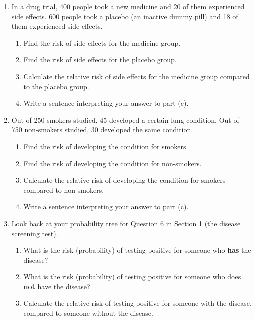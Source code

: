 \documentclass[11pt]{article}
\newcommand{\ans}{\hrulefill}
\newcommand{\anshere}{\par\vspace{0.3em}\noindent\ans\par\vspace{0.3em}}
\begin{document}
\begin{enumerate}
  \item In a drug trial, 400 people took a new medicine and 20 of them experienced side effects. 600 people took a placebo (an inactive dummy pill) and 18 of them experienced side effects.
  \begin{enumerate}
    \item Find the risk of side effects for the medicine group. \ans
    \item Find the risk of side effects for the placebo group. \ans
    \item Calculate the relative risk of side effects for the medicine group compared to the placebo group. \ans
    \item Write a sentence interpreting your answer to part (c).\anshere
  \end{enumerate}

  \item Out of 250 smokers studied, 45 developed a certain lung condition. Out of 750 non-smokers studied, 30 developed the same condition.
  \begin{enumerate}
    \item Find the risk of developing the condition for smokers. \ans
    \item Find the risk of developing the condition for non-smokers. \ans
    \item Calculate the relative risk of developing the condition for smokers compared to non-smokers. \ans
    \item Write a sentence interpreting your answer to part (c).\anshere
  \end{enumerate}

  \item Look back at your probability tree for Question 6 in Section 1 (the disease screening test).
  \begin{enumerate}
    \item What is the risk (probability) of testing positive for someone who \textbf{has} the disease? \ans
    \item What is the risk (probability) of testing positive for someone who does \textbf{not} have the disease? \ans
    \item Calculate the relative risk of testing positive for someone with the disease, compared to someone without the disease.\anshere
  \end{enumerate}
\end{enumerate}
\end{document}
